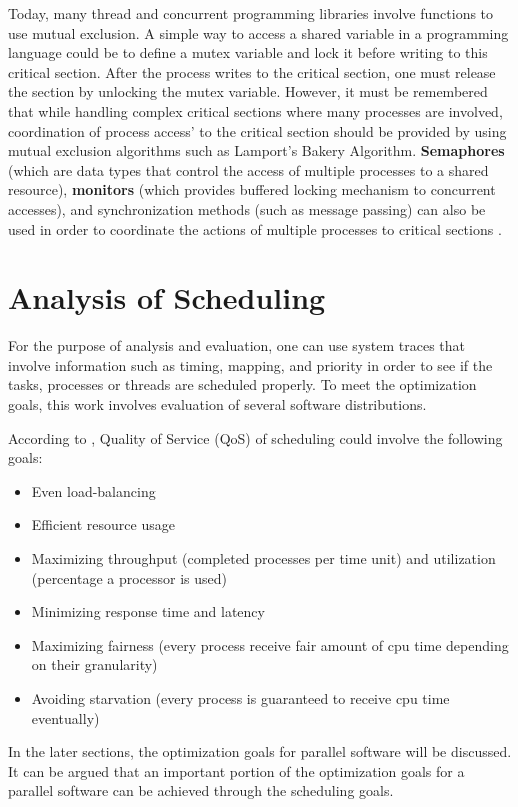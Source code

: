 Today, many thread and concurrent programming libraries involve functions to use mutual exclusion. A simple way to access a shared variable in a programming language could be to define a mutex variable and lock it before writing to this critical section. After the process writes to the critical section, one must release the section by unlocking the mutex variable. However, it must be remembered that while handling complex critical sections where many processes are involved, coordination of process access' to the critical section should be provided by using mutual exclusion algorithms such as Lamport's Bakery Algorithm. \textbf{Semaphores}  (which are data types that control the access of multiple processes to a shared resource), \textbf{monitors} (which provides buffered locking mechanism to concurrent accesses), and synchronization methods (such as message passing) can also be used in order to coordinate the actions of multiple processes to critical sections \cite{lukas1}\cite{springerparallel}.

\section{Analysis of Scheduling}\label{schedulingsection}%
For the purpose of analysis and evaluation, one can use system traces that involve information such as timing, mapping, and priority in order to see if the tasks, processes or threads are scheduled properly. To meet the optimization goals, this work involves evaluation of several software distributions. 

According to \cite{lukas1}, Quality of Service (QoS) of scheduling could involve the following goals:
\begin{itemize}
	\item Even load-balancing
	\item Efficient resource usage 
	\item Maximizing throughput (completed processes per time unit) and utilization (percentage a processor is used)
	\item Minimizing response time and latency
	\item Maximizing fairness (every process receive fair amount of cpu time depending on their granularity)
	\item Avoiding starvation (every process is guaranteed to receive cpu time eventually)
\end{itemize}
In the later sections, the optimization goals for parallel software will be discussed. It can be argued that an important portion of the optimization goals for a parallel software can be achieved through the scheduling goals.

